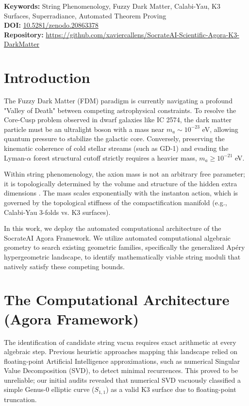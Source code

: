\documentclass[11pt,a4paper]{article}
\begin{document}
\vspace{1em}
\noindent\textbf{Keywords:} String Phenomenology, Fuzzy Dark Matter, Calabi-Yau, K3 Surfaces, Superradiance, Automated Theorem Proving\\
\textbf{DOI:} \href{https://doi.org/10.5281/zenodo.20863378}{10.5281/zenodo.20863378} \\
\textbf{Repository:} \url{https://github.com/xaviercallens/SocrateAI-Scientific-Agora-K3-DarkMatter}

\section{Introduction}
The Fuzzy Dark Matter (FDM) paradigm is currently navigating a profound "Valley of Death" between competing astrophysical constraints. To resolve the Core-Cusp problem observed in dwarf galaxies like IC 2574, the dark matter particle must be an ultralight boson with a mass near $m_a \sim 10^{-23}$ eV, allowing quantum pressure to stabilize the galactic core. Conversely, preserving the kinematic coherence of cold stellar streams (such as GD-1) and evading the Lyman-$\alpha$ forest structural cutoff strictly requires a heavier mass, $m_a \ge 10^{-21}$ eV. 

Within string phenomenology, the axion mass is not an arbitrary free parameter; it is topologically determined by the volume and structure of the hidden extra dimensions \cite{svrcek2006axions}. The mass scales exponentially with the instanton action, which is governed by the topological stiffness of the compactification manifold (e.g., Calabi-Yau 3-folds vs. K3 surfaces). 

In this work, we deploy the automated computational architecture of the SocrateAI Agora Framework. We utilize automated computational algebraic geometry to search existing geometric families, specifically the generalized Ap\'{e}ry hypergeometric landscape, to identify mathematically viable string moduli that natively satisfy these competing bounds.

\section{The Computational Architecture (Agora Framework)}
The identification of candidate string vacua requires exact arithmetic at every algebraic step. Previous heuristic approaches mapping this landscape relied on floating-point Artificial Intelligence approximations, such as numerical Singular Value Decomposition (SVD), to detect minimal recurrences. This proved to be unreliable; our initial audits revealed that numerical SVD vacuously classified a simple Genus-0 elliptic curve ($S_{1,1}$) as a valid K3 surface due to floating-point truncation.
\end{document}

